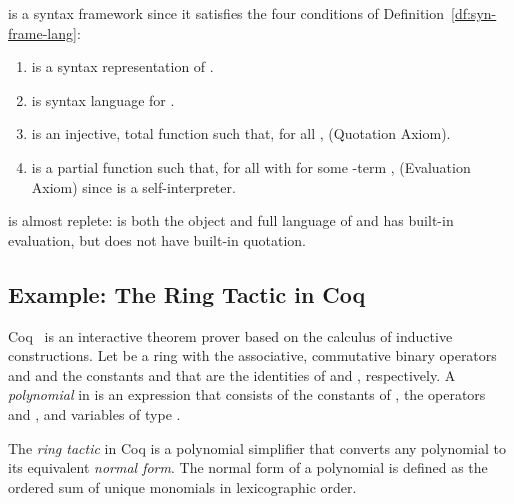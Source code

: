 \documentclass[11pt,fleqn]{article}
\newcommand{\be}{\begin{enumerate}}
\newcommand{\ee}{\end{enumerate}}
\newcommand{\bsp}{\begin{sloppypar}}
\newcommand{\esp}{\end{sloppypar}}
\newcommand{\dblsp}{\ \ }
\newenvironment{proof}{\par\noindent{\bf Proof\dblsp}}{\hfill}
\begin{document}
\begin{proof}
 is a syntax framework since it satisfies the four
  conditions of Definition~\ref{df:syn-frame-lang}:

\be

  \item  is a syntax
    representation of .

  \item  is syntax language for
    .

  \item  is an
    injective, total function such that, for all ,
     (Quotation Axiom).

  \item  is a partial
    function such that, for all  with  for some -term ,  (Evaluation Axiom) since 
    is a self-interpreter.

\ee
\end{proof}

\bigskip

 is almost replete:  is both the object and full
language of  and  has built-in evaluation,
but  does not have built-in quotation.

\iffalse
 does not have built-in quotation, but this can be
defined in  by introducing a constant  such that  for all .  Hence the Mogensen
self-interpretation of lambda calculus can be formulated as a replete
syntax framework.
\fi

\iffalse
\bsp Mogensen also introduces a {\em self-reducer}  for
-terms such that  and provides a proof of correctness for the
self-reducer. Let  be a -term and
 be the marked expression
, where  is the top position in , as
in section~\ref{subsec:marked-expr}.  Then . Therefore,  and the self-reducer for
lambda calculus is a built-in special form of the quasiquotation in
syntax frameworks.  \esp
\fi

\subsection{Example: The Ring Tactic in Coq} \label{subsec:coq}
Coq~\cite{Coq8.4} is an interactive theorem prover based on the
calculus of inductive constructions. Let  be a ring with the
associative, commutative binary operators  and  and the
constants  and  that are the identities of  and ,
respectively. A {\em polynomial} in  is an expression that consists
of the constants of , the operators  and , and variables
 of type .

The {\em ring tactic} in Coq is a polynomial simplifier that converts
any polynomial to its equivalent {\em normal form}. The normal form of
a polynomial is defined as the ordered sum of unique monomials in
lexicographic order.
\end{document}
